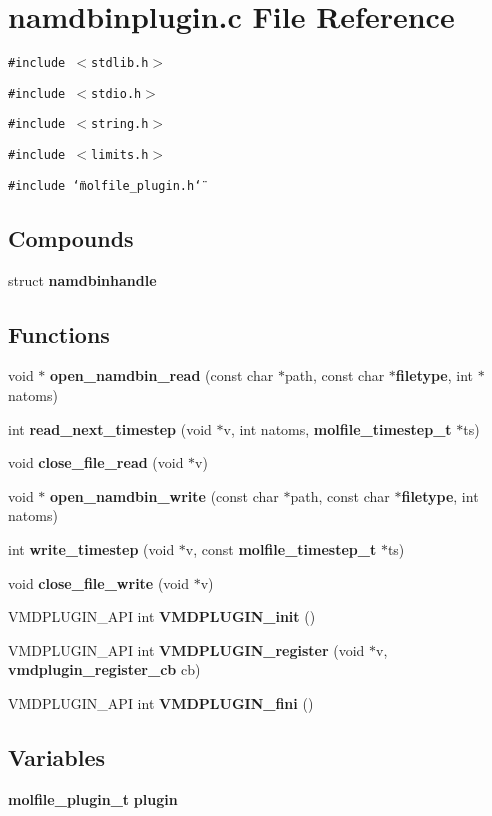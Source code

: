 \section{namdbinplugin.c File Reference}
\label{namdbinplugin_8c}
{\tt \#include $<$stdlib.h$>$}\par
{\tt \#include $<$stdio.h$>$}\par
{\tt \#include $<$string.h$>$}\par
{\tt \#include $<$limits.h$>$}\par
{\tt \#include \char`\"{}molfile\_\-plugin.h\char`\"{}}\par
\subsection*{Compounds}
\begin{CompactItemize}
\item 
struct {\bf namdbinhandle}
\end{CompactItemize}
\subsection*{Functions}
\begin{CompactItemize}
\item 
void $\ast$ {\bf open\_\-namdbin\_\-read} (const char $\ast$path, const char $\ast${\bf filetype}, int $\ast$natoms)
\item 
int {\bf read\_\-next\_\-timestep} (void $\ast$v, int natoms, {\bf molfile\_\-timestep\_\-t} $\ast$ts)
\item 
void {\bf close\_\-file\_\-read} (void $\ast$v)
\item 
void $\ast$ {\bf open\_\-namdbin\_\-write} (const char $\ast$path, const char $\ast${\bf filetype}, int natoms)
\item 
int {\bf write\_\-timestep} (void $\ast$v, const {\bf molfile\_\-timestep\_\-t} $\ast$ts)
\item 
void {\bf close\_\-file\_\-write} (void $\ast$v)
\item 
VMDPLUGIN\_\-API int {\bf VMDPLUGIN\_\-init} ()
\item 
VMDPLUGIN\_\-API int {\bf VMDPLUGIN\_\-register} (void $\ast$v, {\bf vmdplugin\_\-register\_\-cb} cb)
\item 
VMDPLUGIN\_\-API int {\bf VMDPLUGIN\_\-fini} ()
\end{CompactItemize}
\subsection*{Variables}
\begin{CompactItemize}
\item 
{\bf molfile\_\-plugin\_\-t} {\bf plugin}
\end{CompactItemize}


